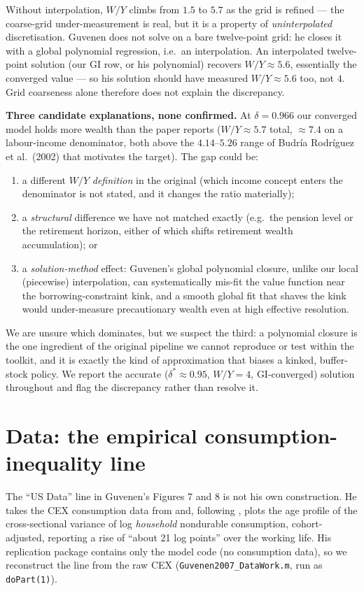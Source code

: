 \documentclass[11pt,fleqn]{article}
\begin{document}
\noindent Without interpolation, $W/Y$ climbs from $1.5$ to $5.7$ as the grid is refined ---
the coarse-grid under-measurement is real, but it is a property of \emph{uninterpolated}
discretisation. Guvenen does not solve on a bare twelve-point grid: he closes it with a
global polynomial regression, i.e.\ an interpolation. An interpolated twelve-point solution
(our GI row, or his polynomial) recovers $W/Y\approx5.6$, essentially the converged value ---
so his solution should have measured $W/Y\approx5.6$ too, not $4$. Grid coarseness alone
therefore does not explain the discrepancy.

\textbf{Three candidate explanations, none confirmed.} At $\delta=0.966$ our converged
model holds more wealth than the paper reports ($W/Y\approx5.7$ total, $\approx7.4$ on a
labour-income denominator, both above the $4.14\text{--}5.26$ range of Budr\'ia Rodr\'iguez
et al.\ (2002) that motivates the target). The gap could be:
\begin{enumerate}
\item a different $W/Y$ \emph{definition} in the original (which income concept enters the
denominator is not stated, and it changes the ratio materially);
\item a \emph{structural} difference we have not matched exactly (e.g.\ the pension level or
the retirement horizon, either of which shifts retirement wealth accumulation); or
\item a \emph{solution-method} effect: Guvenen's global polynomial closure, unlike our
local (piecewise) interpolation, can systematically mis-fit the value function near the
borrowing-constraint kink, and a smooth global fit that shaves the kink would under-measure
precautionary wealth even at high effective resolution.
\end{enumerate}
We are unsure which dominates, but we suspect the third: a polynomial closure is the one
ingredient of the original pipeline we cannot reproduce or test within the toolkit, and it
is exactly the kind of approximation that biases a kinked, buffer-stock policy. We report
the accurate ($\delta^*\approx0.95$, $W/Y=4$, GI-converged) solution throughout and flag
the discrepancy rather than resolve it.

\section{Data: the empirical consumption-inequality line}
\label{app:data}

The ``US Data'' line in Guvenen's Figures 7 and 8 is not his own construction. He takes
the CEX consumption data from \cite{KruegerPerri2006} and, following
\cite{DeatonPaxson1994}, plots the age profile of the cross-sectional variance of log
\emph{household} nondurable consumption, cohort-adjusted, reporting a rise of ``about 21
log points'' over the working life. His replication package contains only the model code
(no consumption data), so we reconstruct the line from the raw CEX
(\texttt{Guvenen2007\_DataWork.m}, run as \texttt{doPart(1)}).
\end{document}
